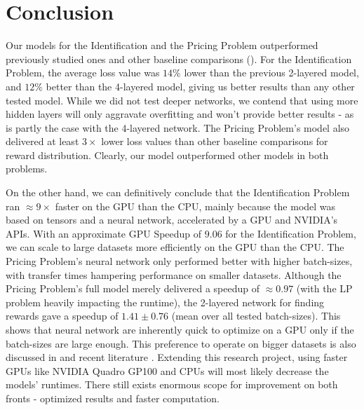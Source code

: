 \section{Conclusion} \label{sec:Conclusion}
Our models for the Identification and the Pricing Problem outperformed previously studied ones \cite{Xue2016Avi2} and other baseline comparisons (). For the Identification Problem, the average loss value was $14\%$ lower than the previous 2-layered model, and $12\%$ better than the 4-layered model, giving us better results than any other tested model. While we did not test deeper networks, we contend that using more hidden layers will only aggravate overfitting and won't provide better results - as is partly the case with the 4-layered network. The Pricing Problem's model also delivered at least $3\times$ lower loss values than other baseline comparisons for reward distribution. Clearly, our model outperformed other models in both problems.

On the other hand, we can definitively conclude that the Identification Problem ran $\approx 9\times$ faster on the GPU than the CPU, mainly because the model was based on tensors and a neural network, accelerated by a GPU and NVIDIA's APIs. With an approximate GPU Speedup of $9.06$ for the Identification Problem, we can scale to large datasets more efficiently on the GPU than the CPU. The Pricing Problem's neural network only performed better with higher batch-sizes, with transfer times hampering performance on smaller datasets. Although the Pricing Problem's full model merely delivered a speedup of $\approx 0.97$ (with the LP problem heavily impacting the runtime), the 2-layered network for finding rewards gave a speedup of $1.41\pm0.76$ (mean over all tested batch-sizes). This shows that neural network are inherently quick to optimize on a GPU only if the batch-sizes are large enough. This preference to operate on bigger datasets is also discussed in  and recent literature \cite[Appendix B]{PattersonARM}. Extending this research project, using faster GPUs like NVIDIA Quadro GP100 and CPUs will most likely decrease the models' runtimes. There still exists enormous scope for improvement on both fronts - optimized results and faster computation.

